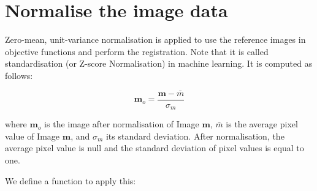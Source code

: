 \documentclass[11pt]{article}
\begin{document}
\hypertarget{normalise-the-image-data}{%
\section{Normalise the image data}\label{normalise-the-image-data}}

Zero-mean, unit-variance normalisation is applied to use the reference
images in objective functions and perform the registration. Note that it
is called standardisation (or Z-score Normalisation) in machine
learning. It is computed as follows:

\[\mathbf{m}_o=\frac{\mathbf{m}-\bar{m}}{\sigma_m}\]

where \(\mathbf{m}_o\) is the image after normalisation of Image
\(\mathbf{m}\), \(\bar{m}\) is the average pixel value of Image
\(\mathbf{m}\), and \(\sigma_m\) its standard deviation. After
normalisation, the average pixel value is null and the standard
deviation of pixel values is equal to one.

We define a function to apply this:
\end{document}
